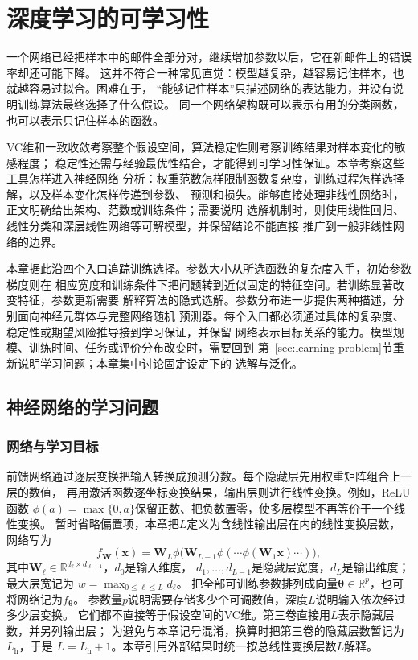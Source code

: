 \chapter{深度学习的可学习性}
\label{chap:deep-learning-theory}

一个网络已经把样本中的邮件全部分对，继续增加参数以后，它在新邮件上的错误率却还可能下降。
这并不符合一种常见直觉：模型越复杂，越容易记住样本，也就越容易过拟合。困难在于，
“能够记住样本”只描述网络的表达能力，并没有说明训练算法最终选择了什么假设。
同一个网络架构既可以表示有用的分类函数，也可以表示只记住样本的函数。

VC维和一致收敛考察整个假设空间，算法稳定性则考察训练结果对样本变化的敏感程度；
稳定性还需与经验最优性结合，才能得到可学习性保证。本章考察这些工具怎样进入神经网络
分析：权重范数怎样限制函数复杂度，训练过程怎样选择解，以及样本变化怎样传递到参数、
预测和损失。能够直接处理非线性网络时，正文明确给出架构、范数或训练条件；需要说明
选解机制时，则使用线性回归、线性分类和深层线性网络等可解模型，并保留结论不能直接
推广到一般非线性网络的边界。

本章据此沿四个入口追踪训练选择。参数大小从所选函数的复杂度入手，初始参数梯度则在
相应宽度和训练条件下把问题转到近似固定的特征空间。若训练显著改变特征，参数更新需要
解释算法的隐式选解。参数分布进一步提供两种描述，分别面向神经元群体与完整网络随机
预测器。每个入口都必须通过具体的复杂度、稳定性或期望风险推导接到学习保证，并保留
网络表示目标关系的能力。模型规模、训练时间、任务或评价分布改变时，需要回到
第~\ref{sec:learning-problem}节重新说明学习问题；本章集中讨论固定设定下的
选解与泛化。

\section{神经网络的学习问题}
\label{sec:network-learning-problem}

\subsection{网络与学习目标}

前馈网络通过逐层变换把输入转换成预测分数。每个隐藏层先用权重矩阵组合上一层的数值，
再用激活函数逐坐标变换结果，输出层则进行线性变换。例如，ReLU函数
$\phi(a)=\max\{0,a\}$保留正数、把负数置零，使多层模型不再等价于一个线性变换。
暂时省略偏置项，本章把$L$定义为含线性输出层在内的线性变换层数，网络写为
\begin{equation}
 f_{\bm W}(\bm x)=\bm W_L\phi\bigl(\bm W_{L-1}\phi(\cdots\phi(\bm W_1\bm x)\cdots)\bigr),
 \label{eq:feedforward-network}
\end{equation}
其中$\bm W_\ell\in\mathbb R^{d_\ell\times d_{\ell-1}}$，$d_0$是输入维度，
$d_1,\ldots,d_{L-1}$是隐藏层宽度，$d_L$是输出维度；最大层宽记为
$w=\max_{0\leq\ell\leq L}d_\ell$。
把全部可训练参数排列成向量$\bm\theta\in\mathbb R^p$，也可将网络记为$f_{\bm\theta}$。
参数量$p$说明需要存储多少个可调数值，深度$L$说明输入依次经过多少层变换。
它们都不直接等于假设空间的VC维。第三卷直接用$L$表示隐藏层数，并另列输出层；
为避免与本章记号混淆，换算时把第三卷的隐藏层数暂记为$L_{\mathrm h}$，于是
$L=L_{\mathrm h}+1$。本章引用外部结果时统一按总线性变换层数$L$解释。

